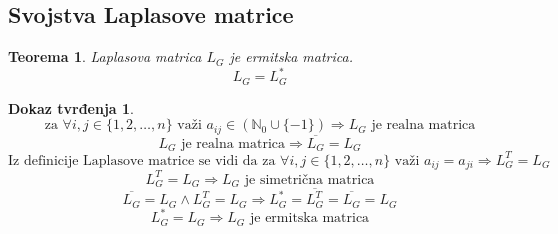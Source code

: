 \documentclass[11pt]{article}
\newtheorem{theorem}{Teorema}
\newtheorem*{custom_proof}{Dokaz tvrđenja}
\begin{document}
	\subsection{Svojstva Laplasove matrice}
	
	\begin{theorem} Laplasova matrica $L_G$ je ermitska matrica.
	\[
	L_G = L_G^*
	\] 
	\end{theorem}
	
	\begin{custom_proof}
	\[
	\text{za }\forall i,j \in \{1, 2, \dots, n\} \text{ važi } a_{ij} \in (\mathbb{N}_0 \cup \{-1\}) \Rightarrow L_G \text{ je realna matrica}
	\]
	\[
	 L_G \text{ je realna matrica} \Rightarrow \overline{L_G} = L_G 
	\]
	\[
	\text{Iz definicije Laplasove matrice se vidi da za } \forall i,j \in \{1, 2, \dots, n\} \text{ važi } a_{ij} = a_{ji} \Rightarrow L_G^T = L_G 
	\]
	\[
	  L_G^T = L_G \Rightarrow L_G \text{ je simetrična matrica}
	\]
	\[
	\overline{L_G} = L_G \land L_G^T = L_G \Rightarrow L_G^* = \overline{L_G^T} = \overline{L_G} = L_G 
	\]
	\[
	L_G^* = L_G \Rightarrow L_G\text{ je ermitska matrica}
	\]
	\end{custom_proof}
	
\end{document}
